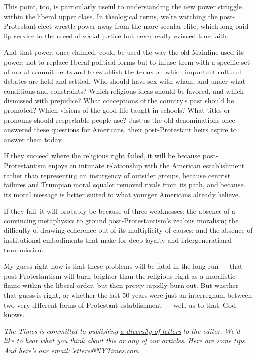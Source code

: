 This point, too, is particularly useful to understanding the new power
struggle within the liberal upper class. In theological terms, we're
watching the post-Protestant elect wrestle power away from the more
secular elite, which long paid lip service to the creed of social
justice but never really evinced true faith.

And that power, once claimed, could be used the way the old Mainline
used its power: not to replace liberal political forms but to infuse
them with a specific set of moral commitments and to establish the terms
on which important cultural debates are held and settled. Who should
have sex with whom, and under what conditions and constraints? Which
religious ideas should be favored, and which dismissed with prejudice?
What conceptions of the country's past should be promoted? Which visions
of the good life taught in schools? What titles or pronouns should
respectable people use? Just as the old denominations once answered
these questions for Americans, their post-Protestant heirs aspire to
answer them today.

If they succeed where the religious right failed, it will be because
post-Protestantism enjoys an intimate relationship with the American
establishment rather than representing an insurgency of outsider groups,
because centrist failures and Trumpian moral squalor removed rivals from
its path, and because its moral message is better suited to what younger
Americans already believe.

If they fail, it will probably be because of three weaknesses: the
absence of a convincing metaphysics to ground post-Protestantism's
zealous moralism; the difficulty of drawing coherence out of its
multiplicity of causes; and the absence of institutional embodiments
that make for deep loyalty and intergenerational transmission.

My guess right now is that these problems will be fatal in the long run
--- that post-Protestantism will burn brighter than the religious right
as a moralistic flame within the liberal order, but then pretty rapidly
burn out. But whether that guess is right, or whether the last 50 years
were just an interregnum between two very different forms of Protestant
establishment --- well, as to that, God knows.

\emph{The Times is committed to publishing}
\href{https://www.nytimes3xbfgragh.onion/2019/01/31/opinion/letters/letters-to-editor-new-york-times-women.html}{\emph{a
diversity of letters}} \emph{to the editor. We'd like to hear what you
think about this or any of our articles. Here are some}
\href{https://help.nytimes3xbfgragh.onion/hc/en-us/articles/115014925288-How-to-submit-a-letter-to-the-editor}{\emph{tips}}\emph{.
And here's our email:}
\href{mailto:letters@NYTimes.com}{\emph{letters@NYTimes.com}}\emph{.}

